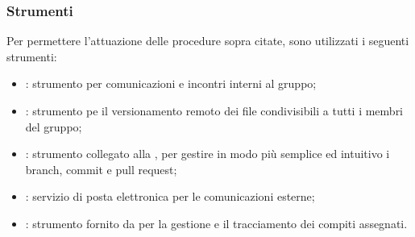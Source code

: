 		 \subsubsection{Strumenti}
		 Per permettere l'attuazione delle procedure sopra citate, sono utilizzati i seguenti strumenti:
		 \begin{itemize}
		 	\item {\bfseries {}}: strumento per comunicazioni e incontri interni al gruppo;
		 	\item {\bfseries {}}: strumento pe il versionamento remoto dei file condivisibili a tutti i membri del gruppo;
		 	\item {\bfseries {}}: strumento collegato alla  , per gestire in modo più semplice ed intuitivo i branch, commit e pull request;
		 	\item {\bfseries {}}: servizio di posta elettronica per le comunicazioni esterne;
		 	\item {\bfseries {}}: strumento fornito da  per la gestione e il tracciamento dei compiti assegnati.
		 \end{itemize}
		